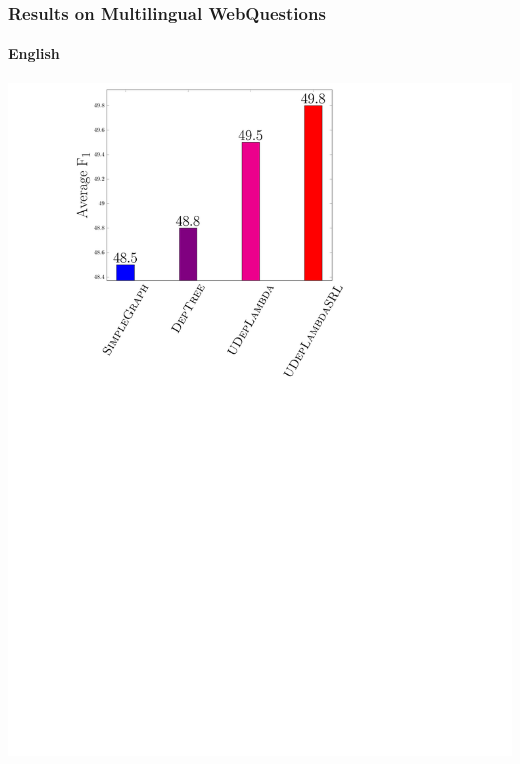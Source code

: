 \documentclass[mathserif,12pt]{beamer}
\begin{document}
\begin{frame}
\frametitle{Results on Multilingual WebQuestions}
\framesubtitle{English}
\centering
\large
\vspace{0.4em}
\includegraphics[trim=9em 0em 29em 1em,clip=true,scale=0.5]{figures/deplambda_results_plot_ud}
\end{frame}
\end{document}
